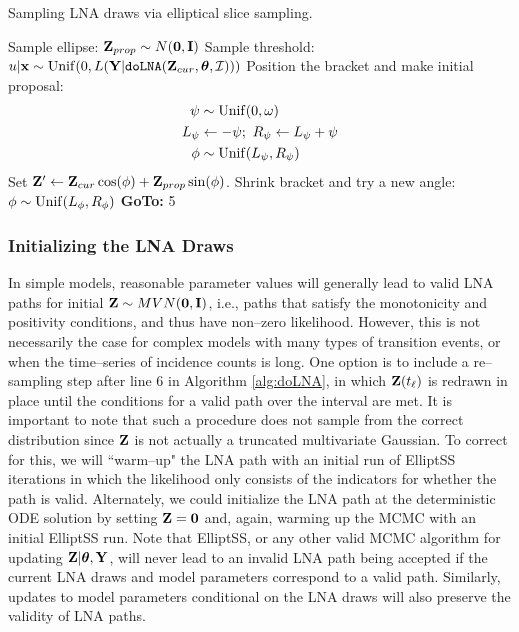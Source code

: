 \begin{algorithm}[htbp]
	\caption{Sampling LNA draws via elliptical slice sampling.}
	\label{alg:elliptss_lna}
	\begin{algorithmic}[1]
		\State Sample ellipse: $ \mathbf{Z}_{prop} \sim N(\boldsymbol{0}, \mathbf{I}) $
		\State Sample threshold: $ u|\mathbf{x} \sim \mathrm{Unif}(0, L(\mathbf{Y}|\texttt{doLNA}(\mathbf{Z}_{cur},\boldsymbol{\theta},\mathcal{I}))) $
		\State Position the bracket and make initial proposal: \vspace{-0.1in}
		\begin{align*}
		\psi &\sim \mathrm{Unif}(0,\omega)\\
		L_\psi &\leftarrow -\psi;\ R_\psi \leftarrow L_\psi + \psi\\
		\phi &\sim \mathrm{Unif}(L_\psi,R_\psi)
		\end{align*}
		\State Set $ \mathbf{Z}' \leftarrow \mathbf{Z}_{cur}\cos(\phi) + \mathbf{Z}_{prop}\sin(\phi) $. 
		\State{}
		\Else
		\State Shrink bracket and try a new angle:
		\State $ \phi \sim \mathrm{Unif}(L_\phi, R_\phi) $
		\State \textbf{GoTo:} 5
		\EndIf
		\EndProcedure
	\end{algorithmic}
\end{algorithm}

\subsubsection{Initializing the LNA Draws}
\label{subsubsec:lna_init}
In simple models, reasonable parameter values will generally lead to valid LNA paths for initial $ \mathbf{Z}\sim MVN(\boldsymbol{0},\mathbf{I}) $, i.e., paths that satisfy the monotonicity and positivity conditions, and thus have non--zero likelihood. However, this is not necessarily the case for complex models with many types of transition events, or when the time--series of incidence counts is long. One option is to include a re--sampling step after line 6 in Algorithm \ref{alg:doLNA}, in which $ \mathbf{Z}(t_\ell) $ is redrawn in place until the conditions for a valid path over the interval are met. It is important to note that such a procedure does not sample from the correct distribution since $ \mathbf{Z} $ is not actually a truncated multivariate Gaussian. To correct for this, we will ``warm--up" the LNA path with an initial run of ElliptSS iterations in which the likelihood only consists of the indicators for whether the path is valid. Alternately, we could initialize the LNA path at the deterministic ODE solution by setting $ \mathbf{Z} = \mathbf{0} $ and, again, warming up the MCMC with an initial ElliptSS run. Note that ElliptSS, or any other valid MCMC algorithm for updating $ \mathbf{Z}|\boldsymbol{\theta},\mathbf{Y} $, will never lead to an invalid LNA path being accepted if the current LNA draws and model parameters correspond to a valid path. Similarly, updates to model parameters conditional on the LNA draws will also preserve the validity of LNA paths.

